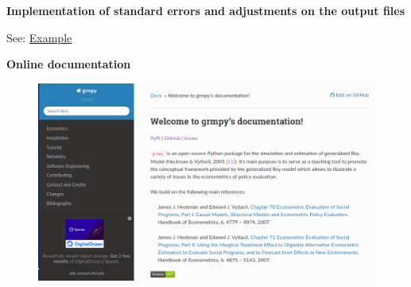 \begin{frame}
\textbf{Implementation of standard errors and adjustments on the output files}
\vfill
\begin{center}
See: \href{examples/est.grmpy.info}{Example}
\end{center}
\vfill
\end{frame}

\begin{frame}
\textbf{Online documentation}
\vfill
\begin{figure}
  \includegraphics[scale=0.2]{figures/docu.png}
\end{figure}
\vfill
\end{frame}
